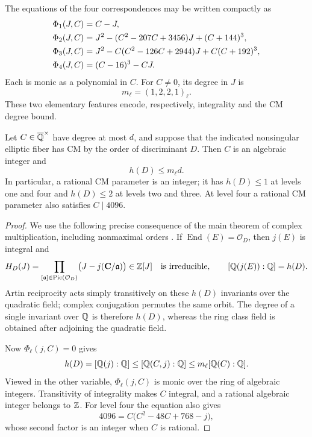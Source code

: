 The equations of the four correspondences may be written compactly as
\begin{align}
 \Phi_1(J,C)&=C-J,\notag\\
 \Phi_2(J,C)&=J^2-(C^2-207C+3456)J+(C+144)^3,
       \label{eq:P2}\\
 \Phi_3(J,C)&=J^2-C(C^2-126C+2944)J+C(C+192)^3,
       \label{eq:P3}\\
 \Phi_4(J,C)&=(C-16)^3-CJ.\notag
\end{align}
Each is monic as a polynomial in $C$.  For $C\ne0$, its degree in
$J$ is
\[
                         m_\ell=(1,2,2,1)_\ell.
\]
These two elementary features encode, respectively, integrality and
the CM degree bound.

\begin{proposition}
\label{prop:rational-cm-integrality}
Let $C\in\overline{\mathbb Q}^\times$ have degree at most $d$, and suppose that
the indicated nonsingular elliptic fiber has CM by the order of
discriminant $D$.  Then $C$ is an algebraic integer and
\[
                             h(D)\le m_\ell d.
\]
In particular, a rational CM parameter is an integer; it has
$h(D)\le1$ at levels one and four and $h(D)\le2$ at levels two
and three.  At level four a rational CM parameter also satisfies
$C\mid4096$.
\end{proposition}
\begin{proof}
We use the following precise consequence of the main theorem of
complex multiplication, including nonmaximal orders
\cite[Chapters~7 and~11]{CoxCM}.  If
$\operatorname{End}(E)=\mathcal O_D$, then $j(E)$ is integral and
\begin{equation}\label{eq:cm-main-packet}
 H_D(J)=\prod_{[\mathfrak a]\in\operatorname{Pic}(\mathcal O_D)}
       \bigl(J-j(\mathbf C/\mathfrak a)\bigr)\in\mathbb Z[J]
 \quad\text{is irreducible},\qquad
 [\mathbb Q(j(E)):\mathbb Q]=h(D).
\end{equation}
Artin reciprocity acts simply transitively on these $h(D)$
invariants over the quadratic field; complex conjugation permutes
the same orbit.  The degree of a single invariant over $\mathbb Q$ is
therefore $h(D)$, whereas the ring class field is obtained after
adjoining the quadratic field.

Now $\Phi_\ell(j,C)=0$ gives
\[
 h(D)=[\mathbb Q(j):\mathbb Q]
       \le[\mathbb Q(C,j):\mathbb Q]\le m_\ell[\mathbb Q(C):\mathbb Q].
\]
Viewed in the other variable, $\Phi_\ell(j,C)$ is monic over the
ring of algebraic integers.  Transitivity of integrality makes
$C$ integral, and a rational algebraic integer belongs to $\mathbb Z$.
For level four the equation also gives
\[
              4096=C\bigl(C^2-48C+768-j\bigr),
\]
whose second factor is an integer when $C$ is rational.
\end{proof}

